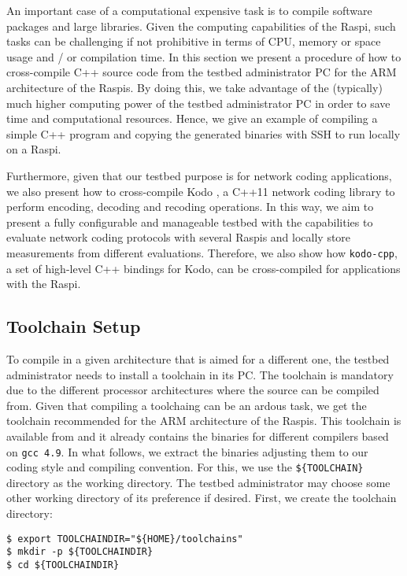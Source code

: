 \label{sec:cross_compilation}
An important case of a computational expensive task is to compile software
packages and large libraries. Given the computing capabilities of the
\ac{Raspi}, such tasks can be challenging if not prohibitive in terms of
\ac{CPU}, memory or space usage and / or compilation time. In
this section we present a procedure of how to cross-compile C++
source code from the testbed administrator \ac{PC} for the \ac{ARM}
architecture of the \ac{Raspi}s. By doing this, we take advantage
of the (typically) much higher computing power of the testbed
administrator \ac{PC} in order to save time and computational resources.
Hence, we give an example of compiling a simple C++ program and
copying the generated binaries with \ac{SSH} to run locally
on a \ac{Raspi}.

Furthermore, given that our testbed purpose is for
network coding applications, we also present how to cross-compile Kodo
\cite{kodo2011pedersen}, a C++11 network coding library to perform
encoding, decoding and recoding operations. In this way, we aim to present
a fully configurable and manageable testbed with the capabilities to
evaluate network coding protocols with several \ac{Raspi}s and locally
store measurements from different evaluations. Therefore, we also show
how \texttt{kodo-cpp}, a set of high-level C++ bindings for Kodo, can be
cross-compiled for applications with the \ac{Raspi}.

\subsection{Toolchain Setup}
To compile in a given architecture that is aimed for a different one,
the testbed administrator needs to install a toolchain in its \ac{PC}.
The toolchain is mandatory due to the different processor architectures
where the source can be compiled from.
Given that compiling a toolchaing can be an ardous task, we get the toolchain
recommended for the \ac{ARM} architecture of the \ac{Raspi}s.
This toolchain is available from \cite{2016rpitoolchain} and
it already contains the binaries for different compilers based on
\texttt{gcc 4.9}. In what follows, we extract the binaries adjusting
them to our coding style and compiling convention. For this, we use the
\texttt{\$\{TOOLCHAIN\}} directory as the working directory.
The testbed administrator may choose some other working directory of
its preference if desired. First, we create the toolchain directory:

\begin{lstlisting}[]
$ export TOOLCHAINDIR="${HOME}/toolchains"
$ mkdir -p ${TOOLCHAINDIR}
$ cd ${TOOLCHAINDIR}
\end{lstlisting}
\FloatBarrier
\vspace{-5mm}

